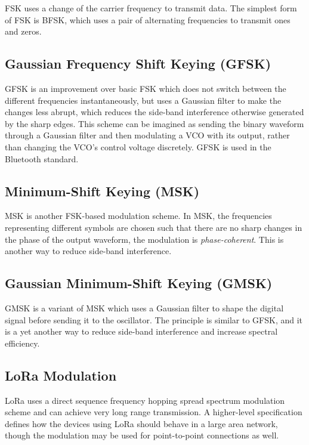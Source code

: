 \Gls{FSK} uses a change of the carrier frequency to transmit data. The simplest form of \gls{FSK} is \gls{BFSK}, which uses a pair of alternating frequencies to transmit ones and zeros.

\subsection{Gaussian Frequency Shift Keying (GFSK)}

\Gls{GFSK} is an improvement over basic \gls{FSK} which does not switch between the different frequencies instantaneously, but uses a Gaussian filter to make the changes less abrupt, which reduces the side-band interference otherwise generated by the sharp edges. This scheme can be imagined as sending the binary waveform through a Gaussian filter and then modulating a \gls{VCO} with its output, rather than changing the \gls{VCO}'s control voltage discretely. \Gls{GFSK} is used in the Bluetooth standard.

\subsection{Minimum-Shift Keying (MSK)}

\Gls{MSK} is another \gls{FSK}-based modulation scheme. In \gls{MSK}, the frequencies representing different symbols are chosen such that there are no sharp changes in the phase of the output waveform, the modulation is \textit{phase-coherent}. This is another way to reduce side-band interference.

\subsection{Gaussian Minimum-Shift Keying (GMSK)}

\Gls{GMSK} is a variant of \gls{MSK} which uses a Gaussian filter to shape the digital signal before sending it to the oscillator. The principle is similar to \gls{GFSK}, and it is a yet another way to reduce side-band interference and increase spectral efficiency. %

\subsection{LoRa Modulation}

LoRa uses a direct sequence frequency hopping spread spectrum modulation scheme and can achieve very long range transmission. A higher-level specification defines how the devices using LoRa should behave in a large area network, though the modulation may be used for point-to-point connections as well.

